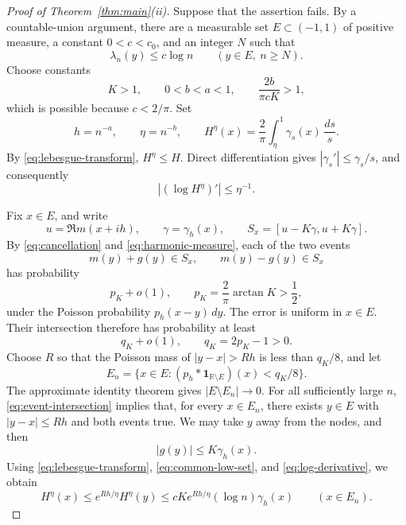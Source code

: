 \documentclass[11pt]{article}
\numberwithin{equation}{section}
\begin{document}
\begin{proof}[Proof of Theorem~\ref{thm:main}(ii)]
Suppose that the assertion fails. By a countable-union argument, there are a
measurable set \(E\subset(-1,1)\) of positive measure, a constant \(0<c<c_0\),
and an integer \(N\) such that
\begin{equation}\label{eq:common-low-set}
 \lambda_n(y)\le c\log n\qquad(y\in E,\ n\ge N).
\end{equation}
Choose constants
\[
 K>1,\qquad 0<b<a<1,\qquad \frac{2b}{\pi cK}>1,
\]
which is possible because \(c<2/\pi\). Set
\[
 h=n^{-a},\qquad\eta=n^{-b},\qquad
 H^\eta(x)=\frac2\pi\int_\eta^1\gamma_s(x)\,\frac{ds}{s}.
\]
By \eqref{eq:lebesgue-transform}, \(H^\eta\le H\). Direct differentiation
gives \(|\gamma_s'|\le\gamma_s/s\), and consequently
\begin{equation}\label{eq:log-derivative}
 |(\log H^\eta)'|\le\eta^{-1}.
\end{equation}

Fix \(x\in E\), and write
\[
 u=\Re m(x+ih),\qquad\gamma=\gamma_h(x),\qquad
 S_x=[u-K\gamma,u+K\gamma].
\]
By \eqref{eq:cancellation} and \eqref{eq:harmonic-measure}, each of the two events
\[
 m(y)+g(y)\in S_x,\qquad m(y)-g(y)\in S_x
\]
has probability
\[
 p_K+o(1),\qquad p_K=\frac2\pi\arctan K>\frac12,
\]
under the Poisson probability \(p_h(x-y)\,dy\). The error is uniform in \(x\in
E\). Their intersection therefore has probability at least
\begin{equation}\label{eq:event-intersection}
 q_K+o(1),\qquad q_K=2p_K-1>0.
\end{equation}
Choose \(R\) so that the Poisson mass of \(|y-x|>Rh\) is less than \(q_K/8\),
and let
\[
 E_n=\{x\in E:(p_h*\mathbf1_{\mathbb R\setminus E})(x)<q_K/8\}.
\]
The approximate identity theorem gives \(|E\setminus E_n|\to0\). For all
sufficiently large \(n\), \eqref{eq:event-intersection} implies that, for
every \(x\in E_n\), there exists \(y\in E\) with \(|y-x|\le Rh\) and both
events true. We may take \(y\) away from the nodes, and then
\[
 |g(y)|\le K\gamma_h(x).
\]
Using \eqref{eq:lebesgue-transform}, \eqref{eq:common-low-set}, and
\eqref{eq:log-derivative}, we obtain
\begin{equation}\label{eq:local-comparison}
 H^\eta(x)\le e^{Rh/\eta}H^\eta(y)
 \le cK e^{Rh/\eta}(\log n)\gamma_h(x)
 \qquad(x\in E_n).
\end{equation}


\end{proof}
\end{document}
